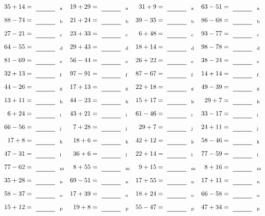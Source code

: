\documentclass
[
  draft    = true,
  fontsize = 11pt,
  parskip  = half-
]
{scrartcl}
\begin{document}
\clearpage
\begin{align*}
    \pline{35+14}&=\rline{a}
  & \pline{19+29}&=\rline{a}
  & \pline{31+9}&=\rline{a}
  & \pline{63-51}&=\rline{a} \\[1ex]
    \pline{88-74}&=\rline{b}
  & \pline{21+24}&=\rline{b}
  & \pline{39-35}&=\rline{b}
  & \pline{86-68}&=\rline{b} \\[1ex]
    \pline{27-21}&=\rline{c}
  & \pline{23+33}&=\rline{c}
  & \pline{6+48}&=\rline{c}
  & \pline{93-77}&=\rline{c} \\[1ex]
    \pline{64-55}&=\rline{d}
  & \pline{29+43}&=\rline{d}
  & \pline{18+14}&=\rline{d}
  & \pline{98-78}&=\rline{d} \\[1ex]
    \pline{81-69}&=\rline{e}
  & \pline{56-44}&=\rline{e}
  & \pline{26+22}&=\rline{e}
  & \pline{38-24}&=\rline{e} \\[1ex]
    \pline{32+13}&=\rline{f}
  & \pline{97-91}&=\rline{f}
  & \pline{87-67}&=\rline{f}
  & \pline{14+14}&=\rline{f} \\[1ex]
    \pline{44-26}&=\rline{g}
  & \pline{17+13}&=\rline{g}
  & \pline{22+18}&=\rline{g}
  & \pline{49-39}&=\rline{g} \\[1ex]
    \pline{13+11}&=\rline{h}
  & \pline{44-23}&=\rline{h}
  & \pline{15+17}&=\rline{h}
  & \pline{29+7}&=\rline{h} \\[1ex]
    \pline{6+24}&=\rline{i}
  & \pline{43+21}&=\rline{i}
  & \pline{61-46}&=\rline{i}
  & \pline{33-17}&=\rline{i} \\[1ex]
    \pline{66-56}&=\rline{j}
  & \pline{7+28}&=\rline{j}
  & \pline{29+7}&=\rline{j}
  & \pline{24+11}&=\rline{j} \\[1ex]
    \pline{17+8}&=\rline{k}
  & \pline{18+6}&=\rline{k}
  & \pline{42+12}&=\rline{k}
  & \pline{58-46}&=\rline{k} \\[1ex]
    \pline{47-31}&=\rline{l}
  & \pline{36+6}&=\rline{l}
  & \pline{22+14}&=\rline{l}
  & \pline{77-59}&=\rline{l} \\[1ex]
    \pline{77-62}&=\rline{m}
  & \pline{8+55}&=\rline{m}
  & \pline{9+15}&=\rline{m}
  & \pline{8+16}&=\rline{m} \\[1ex]
    \pline{35+28}&=\rline{n}
  & \pline{69-51}&=\rline{n}
  & \pline{17+55}&=\rline{n}
  & \pline{17+11}&=\rline{n} \\[1ex]
    \pline{58-37}&=\rline{o}
  & \pline{17+39}&=\rline{o}
  & \pline{18+24}&=\rline{o}
  & \pline{66-58}&=\rline{o} \\[1ex]
    \pline{15+12}&=\rline{p}
  & \pline{19+8}&=\rline{p}
  & \pline{55-47}&=\rline{p}
  & \pline{47+34}&=\rline{p}
\end{align*}
\end{document}
